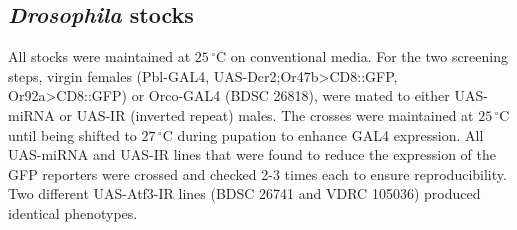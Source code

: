 \subsection*{\emph{Drosophila} stocks}

All stocks were maintained at $25\,^{\circ}\mathrm{C}$ on conventional media.
For the two screening steps, virgin females (Pbl-GAL4, UAS-Dcr2;Or47b\textgreater{}CD8::GFP, Or92a\textgreater{}CD8::GFP) or Orco-GAL4 (BDSC 26818), were mated to either UAS-miRNA or UAS-IR (inverted repeat) males.
The crosses were maintained at $25\,^{\circ}\mathrm{C}$ until being shifted to $27\,^{\circ}\mathrm{C}$ during pupation to enhance GAL4 expression.
All UAS-miRNA and UAS-IR lines that were found to reduce the expression of the GFP reporters were crossed and checked 2-3 times each to ensure reproducibility.
Two different UAS-Atf3-IR lines (BDSC 26741 and VDRC 105036) produced identical phenotypes.